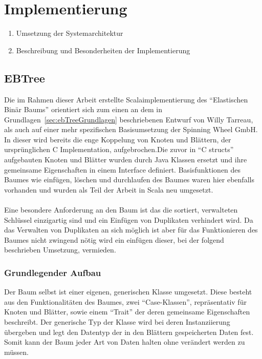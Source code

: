 \documentclass[a4paper,11pt,oneside,%
headsepline,												%
footsepline,												%
bibtotocnumbered									%
]{scrreprt}
\begin{document}
\chapter{Implementierung}
		\begin{enumerate}[1.]
			\item Umsetzung der Systemarchitektur
			\item Beschreibung und Besonderheiten der Implementierung
		\end{enumerate}

\section{EBTree} %
Die im Rahmen dieser Arbeit erstellte Scalaimplementierung des \enquote{Elastischen Binär Baums} orientiert sich zum einen an dem in Grundlagen~\ref{sec:ebTreeGrundlagen} beschriebenen Entwurf von Willy Tarreau\autocite{Tarreau}, als auch auf einer mehr spezifischen Basisumsetzung der Spinning Wheel GmbH.\\
In dieser wird bereits die enge Koppelung von Knoten und Blättern, der ursprünglichen C Implementation, aufgebrochen.Die zuvor in \enquote{C structs} aufgebauten Knoten und Blätter wurden durch Java Klassen ersetzt und ihre gemeinsame Eigenschaften in einem Interface definiert. Basisfunktionen des Baumes wie einfügen, löschen und durchlaufen des Baumes waren hier ebenfalls vorhanden und wurden als Teil der Arbeit in Scala neu umgesetzt.\\\\
Eine besondere Anforderung an den Baum ist das die sortiert, verwalteten Schlüssel einzigartig sind und ein Einfügen von Duplikaten verhindert wird. Da das Verwalten von Duplikaten an sich möglich ist aber für das Funktionieren des Baumes nicht zwingend nötig wird ein einfügen dieser, bei der folgend beschrieben Umsetzung, vermieden. \\
\subsection{Grundlegender Aufbau}
Der Baum selbst ist einer eigenen, generischen Klasse umgesetzt. Diese besteht aus den Funktionalitäten des Baumes, zwei \enquote{Case-Klassen}, repräsentativ für Knoten und Blätter, sowie einem \enquote{Trait} der deren gemeinsame Eigenschaften beschreibt. Der generische Typ der Klasse wird bei deren Instanziierung übergeben und legt den Datentyp der in den Blättern gespeicherten Daten fest. Somit kann der Baum jeder Art von Daten halten ohne verändert werden zu müssen.\\
\end{document}
